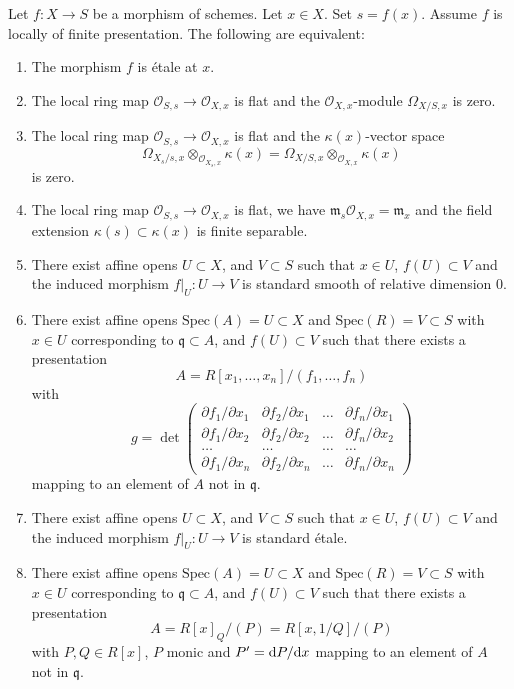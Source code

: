 \begin{lemma}
\label{lemma-etale-at-point}
Let $f : X \to S$ be a morphism of schemes.
Let $x \in X$.
Set $s = f(x)$.
Assume $f$ is locally of finite presentation.
The following are equivalent:
\begin{enumerate}
\item The morphism $f$ is \'etale at $x$.
\item The local ring map $\mathcal{O}_{S, s} \to \mathcal{O}_{X, x}$
is flat and the $\mathcal{O}_{X, x}$-module $\Omega_{X/S, x}$
is zero.
\item The local ring map $\mathcal{O}_{S, s} \to \mathcal{O}_{X, x}$
is flat and the $\kappa(x)$-vector space
$$
\Omega_{X_s/s, x} \otimes_{\mathcal{O}_{X_s, x}} \kappa(x) =
\Omega_{X/S, x} \otimes_{\mathcal{O}_{X, x}} \kappa(x)
$$
is zero.
\item The local ring map $\mathcal{O}_{S, s} \to \mathcal{O}_{X, x}$
is flat, we have $\mathfrak m_s\mathcal{O}_{X, x} = \mathfrak m_x$ and
the field extension $\kappa(s) \subset \kappa(x)$ is finite
separable.
\item There exist affine opens $U \subset X$,
and $V \subset S$ such that $x \in U$, $f(U) \subset V$ and the
induced morphism $f|_U : U \to V$ is standard smooth
of relative dimension $0$.
\item There exist affine opens $\text{Spec}(A) = U \subset X$
and $\text{Spec}(R) = V \subset S$ with $x \in U$ corresponding
to $\mathfrak q \subset A$, and $f(U) \subset V$
such that there exists a presentation
$$
A = R[x_1, \ldots, x_n]/(f_1, \ldots, f_n)
$$
with
$$
g =
\det
\left(
\begin{matrix}
\partial f_1/\partial x_1 &
\partial f_2/\partial x_1 &
\ldots &
\partial f_n/\partial x_1 \\
\partial f_1/\partial x_2 &
\partial f_2/\partial x_2 &
\ldots &
\partial f_n/\partial x_2 \\
\ldots & \ldots & \ldots & \ldots \\
\partial f_1/\partial x_n &
\partial f_2/\partial x_n &
\ldots &
\partial f_n/\partial x_n
\end{matrix}
\right)
$$
mapping to an element of $A$ not in $\mathfrak q$.
\item There exist affine opens $U \subset X$,
and $V \subset S$ such that $x \in U$, $f(U) \subset V$ and the
induced morphism $f|_U : U \to V$ is standard \'etale.
\item There exist affine opens $\text{Spec}(A) = U \subset X$
and $\text{Spec}(R) = V \subset S$ with $x \in U$ corresponding
to $\mathfrak q \subset A$, and $f(U) \subset V$
such that there exists a presentation
$$
A = R[x]_Q/(P) = R[x, 1/Q]/(P)
$$
with $P, Q \in R[x]$, $P$ monic and $P' = {\rm d}P/{\rm d}x$ mapping to
an element of $A$ not in $\mathfrak q$.
\end{enumerate}
\end{lemma}

